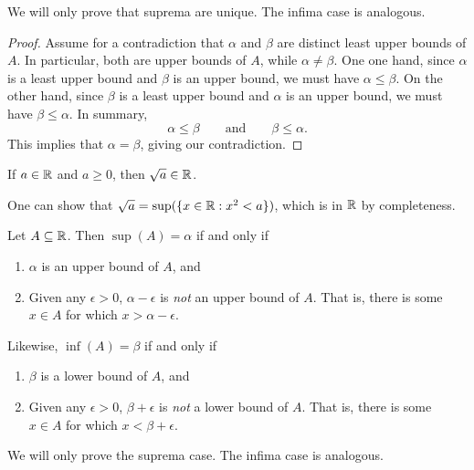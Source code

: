 We will only prove that suprema are unique. The infima case is analogous.

\begin{proof}
  Assume for a contradiction that $\alpha$ and $\beta$ are distinct
  least upper bounds of $A$. In particular, both are upper bounds of
  $A$, while $\alpha \neq \beta$. One one hand, since $\alpha$ is a
  least upper bound and $\beta$ is an upper bound, we must have
  $\alpha \leq \beta$. On the other hand, since $\beta$ is a least
  upper bound and $\alpha$ is an upper bound, we must have $\beta
  \leq \alpha$. In summary,
  \[ \alpha \leq \beta \qquad \text{and} \qquad \beta \leq \alpha. \]
  This implies that $\alpha = \beta$, giving our contradiction.
\end{proof}

\begin{theorem}
  If $a \in \mathbb R$ and $a \geq 0$, then $\sqrt{a} \in \mathbb R$.
\end{theorem}

\begin{proofidea}
  One can show that $\sqrt{a} = \sup(\{ x \in \mathbb R : x^2 < a \})$,
  which is in $\mathbb R$ by completeness.
\end{proofidea}

\begin{theorem}
  Let $A \subseteq \mathbb R$. Then $\sup(A) = \alpha$ if and only if
  \begin{enumerate}
    \item $\alpha$ is an upper bound of $A$, and
    \item Given any $\epsilon > 0$, $\alpha - \epsilon$ is
      \textit{not} an upper bound of $A$. That is, there is some $x
      \in A$ for which $x > \alpha - \epsilon$.
  \end{enumerate}
  Likewise, $\inf(A) = \beta$ if and only if
  \begin{enumerate}
    \item $\beta$ is a lower bound of $A$, and
    \item Given any $\epsilon > 0$, $\beta + \epsilon$ is
      \textit{not} a lower bound of $A$. That is, there is some $x
      \in A$ for which $x < \beta + \epsilon$.
  \end{enumerate}
\end{theorem}

We will only prove the suprema case. The infima case is analogous.

